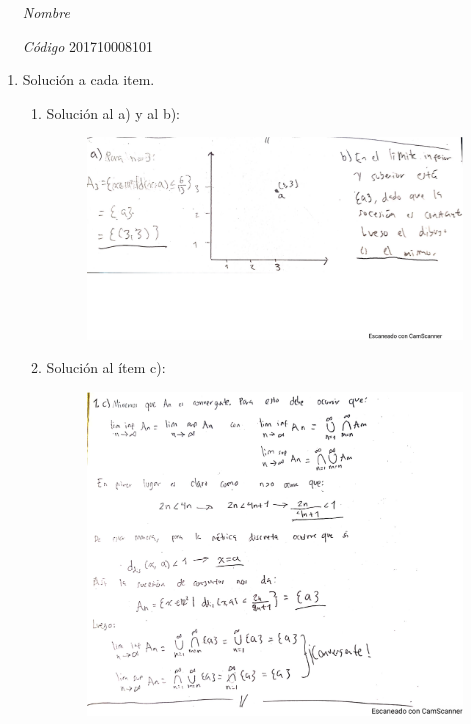 \documentclass[fleqn]{article}
\begin{document}
 \vspace{0.3cm}
   \begin{itemize}[leftmargin=6.25cm, labelsep=0.5cm]

     \item[\textit{Nombre}]  %
     \item[\textit{Código}] 201710008101 %

   \end{itemize}
\vspace{0.3cm}

\begin{enumerate}
  \item Solución a cada item.
    \begin{enumerate}
      \item Solución al a) y al b):
      \begin{figure}[H]
        \centering
        \includegraphics[scale=.4]{figs/1ab}
      \end{figure}
      \item Solución al ítem c):
      \begin{figure}[H]
        \centering
        \includegraphics[scale=.5]{figs/1c}
      \end{figure}
    \end{enumerate}
    \newpage


\end{enumerate}
\end{document}
